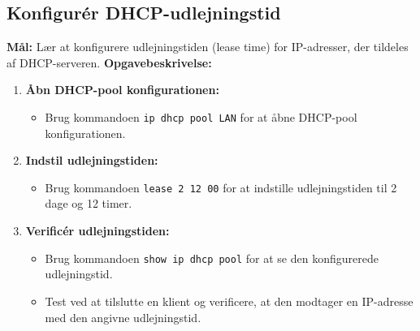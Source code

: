\subsection{Konfigurér DHCP-udlejningstid}
\textbf{Mål:} Lær at konfigurere udlejningstiden (lease time) for IP-adresser, der tildeles af DHCP-serveren.
\newline\newline\noindent
\textbf{Opgavebeskrivelse:}
\begin{enumerate}
	\item \textbf{Åbn DHCP-pool konfigurationen:}
	\begin{itemize}
		\item Brug kommandoen \texttt{ip dhcp pool LAN} for at åbne DHCP-pool konfigurationen.
	\end{itemize}
	\item \textbf{Indstil udlejningstiden:}
	\begin{itemize}
		\item Brug kommandoen \texttt{lease 2 12 00} for at indstille udlejningstiden til 2 dage og 12 timer.
	\end{itemize}
	\item \textbf{Verificér udlejningstiden:}
	\begin{itemize}
		\item Brug kommandoen \texttt{show ip dhcp pool} for at se den konfigurerede udlejningstid.
		\item Test ved at tilslutte en klient og verificere, at den modtager en IP-adresse med den angivne udlejningstid.
	\end{itemize}
\end{enumerate}


